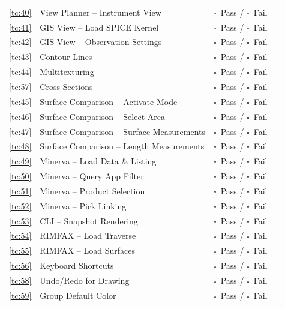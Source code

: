 \documentclass[a4paper,11pt]{article}
\newcommand{\checkbox}{$\square$}
\begin{document}
\begin{longtable}{p{1.8cm} p{6.5cm} p{2.5cm} p{2.5cm}}
		\ref{tc:40} & View Planner -- Instrument View & \checkbox~Pass / \checkbox~Fail & \\
		\ref{tc:41} & GIS View -- Load SPICE Kernel & \checkbox~Pass / \checkbox~Fail & \\
		\ref{tc:42} & GIS View -- Observation Settings & \checkbox~Pass / \checkbox~Fail & \\
		\ref{tc:43} & Contour Lines & \checkbox~Pass / \checkbox~Fail & \\
		\ref{tc:44} & Multitexturing & \checkbox~Pass / \checkbox~Fail & \\
		\ref{tc:57} & Cross Sections & \checkbox~Pass / \checkbox~Fail & \\
		\ref{tc:45} & Surface Comparison -- Activate Mode & \checkbox~Pass / \checkbox~Fail & \\
		\ref{tc:46} & Surface Comparison -- Select Area & \checkbox~Pass / \checkbox~Fail & \\
		\ref{tc:47} & Surface Comparison -- Surface Measurements & \checkbox~Pass / \checkbox~Fail & \\
		\ref{tc:48} & Surface Comparison -- Length Measurements & \checkbox~Pass / \checkbox~Fail & \\
		\ref{tc:49} & Minerva -- Load Data \& Listing & \checkbox~Pass / \checkbox~Fail & \\
		\ref{tc:50} & Minerva -- Query App Filter & \checkbox~Pass / \checkbox~Fail & \\
		\ref{tc:51} & Minerva -- Product Selection & \checkbox~Pass / \checkbox~Fail & \\
		\ref{tc:52} & Minerva -- Pick Linking & \checkbox~Pass / \checkbox~Fail & \\
		\ref{tc:53} & CLI -- Snapshot Rendering & \checkbox~Pass / \checkbox~Fail & \\
		\ref{tc:54} & RIMFAX -- Load Traverse & \checkbox~Pass / \checkbox~Fail & \\
		\ref{tc:55} & RIMFAX -- Load Surfaces & \checkbox~Pass / \checkbox~Fail & \\
		\ref{tc:56} & Keyboard Shortcuts & \checkbox~Pass / \checkbox~Fail & \\
		\ref{tc:58} & Undo/Redo for Drawing & \checkbox~Pass / \checkbox~Fail & \\
		\ref{tc:59} & Group Default Color & \checkbox~Pass / \checkbox~Fail & \\
		\bottomrule
	\end{longtable}
	
	\newpage
	
\end{document}
